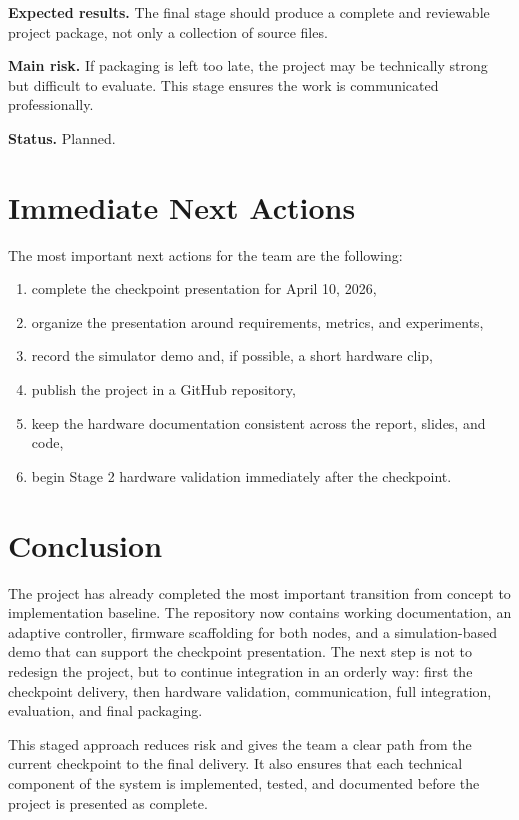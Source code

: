\documentclass[11pt,a4paper]{article}
\begin{document}
\textbf{Expected results.} The final stage should produce a complete and reviewable project package, not only a collection of source files.

\textbf{Main risk.} If packaging is left too late, the project may be technically strong but difficult to evaluate. This stage ensures the work is communicated professionally.

\textbf{Status.} Planned.

\section{Immediate Next Actions}

The most important next actions for the team are the following:

\begin{enumerate}
    \item complete the checkpoint presentation for April 10, 2026,
    \item organize the presentation around requirements, metrics, and experiments,
    \item record the simulator demo and, if possible, a short hardware clip,
    \item publish the project in a GitHub repository,
    \item keep the hardware documentation consistent across the report, slides, and code,
    \item begin Stage 2 hardware validation immediately after the checkpoint.
\end{enumerate}

\section{Conclusion}

The project has already completed the most important transition from concept to implementation baseline. The repository now contains working documentation, an adaptive controller, firmware scaffolding for both nodes, and a simulation-based demo that can support the checkpoint presentation. The next step is not to redesign the project, but to continue integration in an orderly way: first the checkpoint delivery, then hardware validation, communication, full integration, evaluation, and final packaging.

This staged approach reduces risk and gives the team a clear path from the current checkpoint to the final delivery. It also ensures that each technical component of the system is implemented, tested, and documented before the project is presented as complete.
\end{document}
